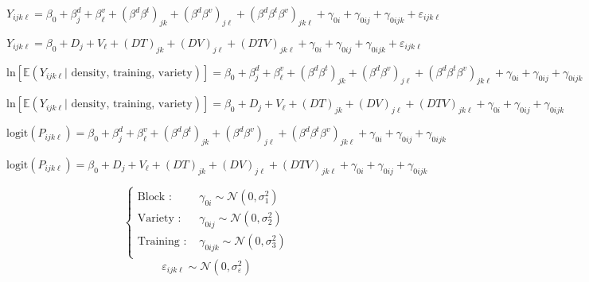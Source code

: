 \documentclass[a4paper, landscape, 11pt]{article}
\title{}
\author{}
\date{}
\begin{document}
\LARGE
\[
Y_{ijk\ell} = \beta_0 + \beta_j^d + \beta_{\ell}^v + \left( \beta^d\beta^t \right)_{jk} + \left( \beta^d\beta^v \right)_{j\ell} + \left( \beta^d\beta^t\beta^v \right)_{jk\ell} +\gamma_{0i} + \gamma_{0ij} + \gamma_{0ijk}  + \varepsilon_{ijk\ell}
\]

\newpage

\[
Y_{ijk\ell} = \beta_0 + D_j + V_\ell + \left( DT \right)_{jk} + \left( DV \right)_{j\ell} + \left( DTV \right)_{jk\ell} +\gamma_{0i} + \gamma_{0ij} + \gamma_{0ijk}  + \varepsilon_{ijk\ell}
\]

\newpage

\[
\text{ln}\left[\mathbb{E}\left( Y_{ijk\ell} | \text{ density, training, variety} \right) \right] = \beta_0 + \beta_j^d + \beta_{\ell}^v + \left( \beta^d\beta^t \right)_{jk} + \left( \beta^d\beta^v \right)_{j\ell} + \left( \beta^d\beta^t\beta^v \right)_{jk\ell} +\gamma_{0i} + \gamma_{0ij} + \gamma_{0ijk} 
\]

\newpage

\[
\text{ln}\left[\mathbb{E}\left( Y_{ijk\ell} | \text{ density, training, variety} \right) \right] = \beta_0 + D_j + V_\ell + \left( DT \right)_{jk} + \left( DV \right)_{j\ell} + \left( DTV \right)_{jk\ell}+\gamma_{0i} + \gamma_{0ij} + \gamma_{0ijk} 
\]

\newpage

\[
\text{logit}\left( P_{ijk\ell} \right) = \beta_0 + \beta_j^d + \beta_{\ell}^v + \left( \beta^d\beta^t \right)_{jk} + \left( \beta^d\beta^v \right)_{j\ell} + \left( \beta^d\beta^t\beta^v \right)_{jk\ell}+\gamma_{0i} + \gamma_{0ij} + \gamma_{0ijk} 
\]


\newpage

\[
\text{logit}\left( P_{ijk\ell} \right) = \beta_0 + D_j + V_\ell + \left( DT \right)_{jk} + \left( DV \right)_{j\ell} + \left( DTV \right)_{jk\ell}+\gamma_{0i} + \gamma_{0ij} + \gamma_{0ijk} 
\]

\newpage

\[
\begin{cases}
 \text{Block : } & \gamma_{0i} \sim \mathcal{N}\left( 0, \sigma_1^2 \right)\\
 \text{Variety : } & \gamma_{0ij} \sim \mathcal{N}\left( 0, \sigma_2^2 \right)\\
 \text{Training : } & \gamma_{0ijk} \sim \mathcal{N}\left( 0, \sigma_3^2 \right)\\
\end{cases}
\]
\vspace{3cm}
\[
\varepsilon_{ijk\ell} \sim \mathcal{N}\left( 0, \sigma^2_\varepsilon \right)
\]
\end{document}
